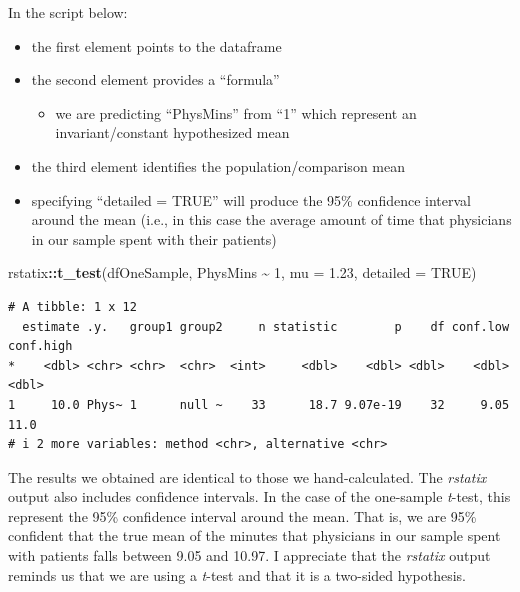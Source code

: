 \documentclass[
  11pt,
]{book}
\newenvironment{Shaded}{\begin{snugshade}}{\end{snugshade}}
\newcommand{\AttributeTok}[1]{\textcolor[rgb]{0.27,0.27,0.27}{#1}}
\newcommand{\ConstantTok}[1]{\textcolor[rgb]{0.37,0.37,0.37}{#1}}
\newcommand{\DecValTok}[1]{\textcolor[rgb]{0.06,0.06,0.06}{#1}}
\newcommand{\FloatTok}[1]{\textcolor[rgb]{0.06,0.06,0.06}{#1}}
\newcommand{\FunctionTok}[1]{\textcolor[rgb]{0.27,0.27,0.27}{\textbf{#1}}}
\newcommand{\NormalTok}[1]{#1}
\newcommand{\SpecialCharTok}[1]{\textcolor[rgb]{0.43,0.43,0.43}{\textbf{#1}}}
\providecommand{\tightlist}{%
  \setlength{\itemsep}{0pt}\setlength{\parskip}{0pt}}
\begin{document}
In the script below:

\begin{itemize}
\tightlist
\item
  the first element points to the dataframe
\item
  the second element provides a ``formula''

  \begin{itemize}
  \tightlist
  \item
    we are predicting ``PhysMins'' from ``1'' which represent an invariant/constant hypothesized mean
  \end{itemize}
\item
  the third element identifies the population/comparison mean
\item
  specifying ``detailed = TRUE'' will produce the 95\% confidence interval around the mean (i.e., in this case the average amount of time that physicians in our sample spent with their patients)
\end{itemize}

\begin{Shaded}
\begin{Highlighting}[]
\NormalTok{rstatix}\SpecialCharTok{::}\FunctionTok{t\_test}\NormalTok{(dfOneSample, PhysMins }\SpecialCharTok{\textasciitilde{}} \DecValTok{1}\NormalTok{, }\AttributeTok{mu =} \FloatTok{1.23}\NormalTok{, }\AttributeTok{detailed =} \ConstantTok{TRUE}\NormalTok{)}
\end{Highlighting}
\end{Shaded}

\begin{verbatim}
# A tibble: 1 x 12
  estimate .y.   group1 group2     n statistic        p    df conf.low conf.high
*    <dbl> <chr> <chr>  <chr>  <int>     <dbl>    <dbl> <dbl>    <dbl>     <dbl>
1     10.0 Phys~ 1      null ~    33      18.7 9.07e-19    32     9.05      11.0
# i 2 more variables: method <chr>, alternative <chr>
\end{verbatim}

The results we obtained are identical to those we hand-calculated. The \emph{rstatix} output also includes confidence intervals. In the case of the one-sample \emph{t}-test, this represent the 95\% confidence interval around the mean. That is, we are 95\% confident that the true mean of the minutes that physicians in our sample spent with patients falls between 9.05 and 10.97. I appreciate that the \emph{rstatix} output reminds us that we are using a \emph{t}-test and that it is a two-sided hypothesis.
\end{document}
